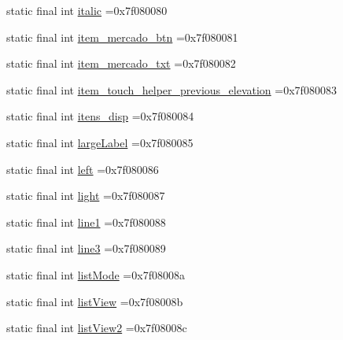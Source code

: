 \begin{DoxyCompactItemize}
static final int \mbox{\hyperlink{classbr_1_1unb_1_1cic_1_1mp_1_1marketmaster_1_1R_1_1id_a35ec8909e4918b5de1a94bb0599b0b7f}{italic}} =0x7f080080
\item 
static final int \mbox{\hyperlink{classbr_1_1unb_1_1cic_1_1mp_1_1marketmaster_1_1R_1_1id_ad887d0aacbbf2c3c5bbe47311d6a42a9}{item\+\_\+mercado\+\_\+btn}} =0x7f080081
\item 
static final int \mbox{\hyperlink{classbr_1_1unb_1_1cic_1_1mp_1_1marketmaster_1_1R_1_1id_a680a956c32ea53d8c736e36472d7c375}{item\+\_\+mercado\+\_\+txt}} =0x7f080082
\item 
static final int \mbox{\hyperlink{classbr_1_1unb_1_1cic_1_1mp_1_1marketmaster_1_1R_1_1id_aef09451792d63cab3db2ba007cbcfddb}{item\+\_\+touch\+\_\+helper\+\_\+previous\+\_\+elevation}} =0x7f080083
\item 
static final int \mbox{\hyperlink{classbr_1_1unb_1_1cic_1_1mp_1_1marketmaster_1_1R_1_1id_abf746ee765bcc6f996988a750861fdb7}{itens\+\_\+disp}} =0x7f080084
\item 
static final int \mbox{\hyperlink{classbr_1_1unb_1_1cic_1_1mp_1_1marketmaster_1_1R_1_1id_a9a028f4c2b1f8f14e4be159dc9ab3431}{large\+Label}} =0x7f080085
\item 
static final int \mbox{\hyperlink{classbr_1_1unb_1_1cic_1_1mp_1_1marketmaster_1_1R_1_1id_a2391d2979a246a6e4f3a42cfd42941d8}{left}} =0x7f080086
\item 
static final int \mbox{\hyperlink{classbr_1_1unb_1_1cic_1_1mp_1_1marketmaster_1_1R_1_1id_a54d48e2d7ad8ecce76da6528b18ed39e}{light}} =0x7f080087
\item 
static final int \mbox{\hyperlink{classbr_1_1unb_1_1cic_1_1mp_1_1marketmaster_1_1R_1_1id_acfcb1ed9e1e8dc2a899e3e3761b114f5}{line1}} =0x7f080088
\item 
static final int \mbox{\hyperlink{classbr_1_1unb_1_1cic_1_1mp_1_1marketmaster_1_1R_1_1id_adc0961b21e66172ff9c07540fe3f1090}{line3}} =0x7f080089
\item 
static final int \mbox{\hyperlink{classbr_1_1unb_1_1cic_1_1mp_1_1marketmaster_1_1R_1_1id_af721f219d4891db66d6733d1af8c6046}{list\+Mode}} =0x7f08008a
\item 
static final int \mbox{\hyperlink{classbr_1_1unb_1_1cic_1_1mp_1_1marketmaster_1_1R_1_1id_a6433406ed95d869a5222272febfd0fde}{list\+View}} =0x7f08008b
\item 
static final int \mbox{\hyperlink{classbr_1_1unb_1_1cic_1_1mp_1_1marketmaster_1_1R_1_1id_aea4e33c33d15d02c51609c8c2fa72e23}{list\+View2}} =0x7f08008c
\item 

\end{DoxyCompactItemize}

